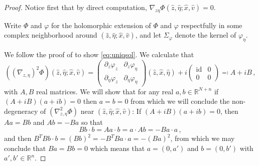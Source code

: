 \documentclass[
	fontsize=11pt, 
	twoside=false, 
	abstract=true, 
	a4paper,
]{scrartcl}
\newcommand{\RR}{\mathbb{R}}
\newcommand{\del}{\partial}
\newcommand{\id}{\mathrm{id}}
\begin{document}
\begin{proof}
	Notice first that by direct computation, $\nabla_{z\eta}\Phi(\hat z,\hat \eta; \hat x, \hat v) = 0$.

	Write $\Phi$ and $\varphi$ for the holomorphic extension of $\Phi$ and $\varphi$ respectfully in some complex neighborhood around $(\hat z, \hat \eta; \hat x,\hat v)$, and let $\Sigma_\varphi$ denote the kernel of $\varphi_\eta$.

	We follow the proof of \cite[Lem.~5.11]{2306.05906v1} to show \cref{eq:uniqsol}. We calculate that
	\[
		((\nabla_{z, \eta})^2\Phi)(\hat z, \hat \eta; \hat x, \hat v) = 
		\begin{pmatrix}
			\del_z \varphi_z & \del_z \varphi_\eta \\
			\del_\eta \varphi_z & \del_\eta \varphi_\eta
		\end{pmatrix}(\hat z,\hat x,\hat\eta)
		+ i
		\begin{pmatrix}
			\id & 0\\
			0 & 0
		\end{pmatrix}
		\eqcolon A+iB\,,
	\]
	with $A,B$ real matrices. We will show that for any real $a,b \in \RR^{N+n}$ if $(A+iB)(a+ib) =0$ then $a=b=0$ from which we will conclude the non-degeneracy of $(\nabla_{z,\eta}^2\Phi)$ near $(\hat z, \hat \eta;\hat x, \hat v)$:
	If $(A+iB)(a+ib) =0$, then $Aa = Bb$ and $Ab = -Ba$ so that
	\[
		Bb\cdot b = A a \cdot b = a\cdot Ab = -Ba\cdot a\,,
	\]
	and then $B^TB b\cdot b = (Bb)^2 = -B^T B a \cdot a = -(Ba)^2$, from which we may conclude that $Ba = Bb = 0$ which means that $a = (0, a')$ and $b = (0,b')$ with $a',b'\in \RR^n$. 


\end{proof}
\end{document}
